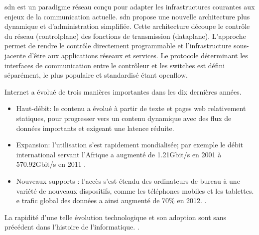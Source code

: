 \gls{sdn} est un \gls{paradigme} réseau conçu pour adapter les infrastructures courantes aux enjeux de la communication actuelle.
\gls{sdn} propose une nouvelle architecture plus dynamique et d'administration simplifiée. Cette architecture découpe le contrôle du réseau (\gls{controlplane}) des fonctions de transmission (\gls{dataplane}). L'approche permet de rendre le contrôle directement programmable et l'infrastructure sous-jacente d'être  aux applications réseaux et services. Le protocole déterminant les interfaces de communication entre le contrôleur et les switches est défini séparément, le plus populaire et standardisé étant \gls{openflow}. \cite{OpenFlowStanford} \cite{ODCAintro} \cite{SDNNewNormONFExecutiveSummary}

\vspace*{1\baselineskip}




Internet a évolué de trois manières importantes dans les dix dernières années. %
\begin{itemize}
\itemsep0.5em 
\item Haut-débit: le contenu a évolué à partir de texte et pages web relativement statiques, pour progresser vers un contenu dynamique avec des flux de données importants et exigeant  une latence réduite. 
\item Expansion: l'utilisation s'est rapidement mondialisée; par exemple le débit international servant l'Afrique a augmenté de 1.21Gbit/s en 2001 à 570.92Gbit/s en 2011 \cite{InternetGlobalGrowthImpactDevelopingCountries}. 
\item  Nouveaux supports : l'accès s'est étendu des ordinateurs de bureau à une variété de nouveaux dispositifs, comme les téléphones mobiles et les tablettes. e trafic global des données a ainsi augmenté de 70\% en 2012. \cite{CiscoVNI2013}. \\
\end{itemize}

\par
La rapidité d'une telle évolution technologique et son adoption sont sans précédent dans l'histoire de l'informatique. \cite{InternetGlobalGrowthImpactDevelopingCountries}.


